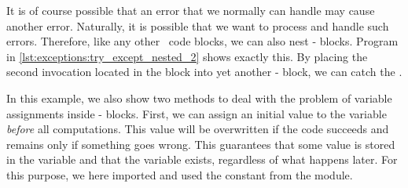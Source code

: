 %
%
%
It is of course possible that an error that we normally can handle may cause another error.
Naturally, it is possible that we want to process and handle such errors.
Therefore, like any other \python\ code blocks, we can also nest - blocks.
Program  in \cref{lst:exceptions:try_except_nested_2} shows exactly this.
By placing the second  invocation located in the  block into yet another - block, we can catch the .

In this example, we also show two methods to deal with the problem of variable assignments inside - blocks.
First, we can assign an initial value to the variable \emph{before} all computations.
This value will be overwritten if the code succeeds and remains only if something goes wrong.
This guarantees that some value is stored in the variable and that the variable exists, regardless of what happens later.
For this purpose, we here imported and used the constant  from the  module.

